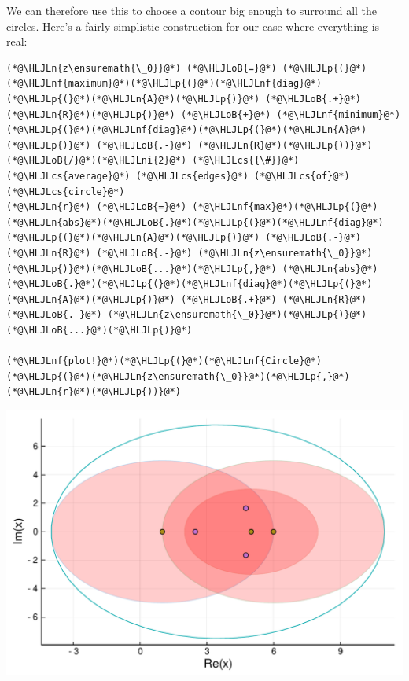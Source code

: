 \documentclass[12pt,a4paper]{article}
\newcommand{\HLJLn}[1]{#1}
\newcommand{\HLJLnf}[1]{\textcolor[RGB]{66,102,213}{#1}}
\newcommand{\HLJLni}[1]{\textcolor[RGB]{59,151,46}{#1}}
\newcommand{\HLJLoB}[1]{\textcolor[RGB]{102,102,102}{\textbf{#1}}}
\newcommand{\HLJLp}[1]{#1}
\newcommand{\HLJLcs}[1]{\textcolor[RGB]{153,153,119}{\textit{#1}}}
\begin{document}
We can therefore use this to choose a contour big enough to surround all the circles. Here's a fairly simplistic construction for our case where everything is real:


\begin{lstlisting}
(*@\HLJLn{z\ensuremath{\_0}}@*) (*@\HLJLoB{=}@*) (*@\HLJLp{(}@*)(*@\HLJLnf{maximum}@*)(*@\HLJLp{(}@*)(*@\HLJLnf{diag}@*)(*@\HLJLp{(}@*)(*@\HLJLn{A}@*)(*@\HLJLp{)}@*) (*@\HLJLoB{.+}@*) (*@\HLJLn{R}@*)(*@\HLJLp{)}@*) (*@\HLJLoB{+}@*) (*@\HLJLnf{minimum}@*)(*@\HLJLp{(}@*)(*@\HLJLnf{diag}@*)(*@\HLJLp{(}@*)(*@\HLJLn{A}@*)(*@\HLJLp{)}@*) (*@\HLJLoB{.-}@*) (*@\HLJLn{R}@*)(*@\HLJLp{))}@*) (*@\HLJLoB{/}@*)(*@\HLJLni{2}@*) (*@\HLJLcs{{\#}}@*) (*@\HLJLcs{average}@*) (*@\HLJLcs{edges}@*) (*@\HLJLcs{of}@*) (*@\HLJLcs{circle}@*)
(*@\HLJLn{r}@*) (*@\HLJLoB{=}@*) (*@\HLJLnf{max}@*)(*@\HLJLp{(}@*)(*@\HLJLn{abs}@*)(*@\HLJLoB{.}@*)(*@\HLJLp{(}@*)(*@\HLJLnf{diag}@*)(*@\HLJLp{(}@*)(*@\HLJLn{A}@*)(*@\HLJLp{)}@*) (*@\HLJLoB{.-}@*) (*@\HLJLn{R}@*) (*@\HLJLoB{.-}@*) (*@\HLJLn{z\ensuremath{\_0}}@*)(*@\HLJLp{)}@*)(*@\HLJLoB{...}@*)(*@\HLJLp{,}@*) (*@\HLJLn{abs}@*)(*@\HLJLoB{.}@*)(*@\HLJLp{(}@*)(*@\HLJLnf{diag}@*)(*@\HLJLp{(}@*)(*@\HLJLn{A}@*)(*@\HLJLp{)}@*) (*@\HLJLoB{.+}@*) (*@\HLJLn{R}@*) (*@\HLJLoB{.-}@*) (*@\HLJLn{z\ensuremath{\_0}}@*)(*@\HLJLp{)}@*)(*@\HLJLoB{...}@*)(*@\HLJLp{)}@*)

(*@\HLJLnf{plot!}@*)(*@\HLJLp{(}@*)(*@\HLJLnf{Circle}@*)(*@\HLJLp{(}@*)(*@\HLJLn{z\ensuremath{\_0}}@*)(*@\HLJLp{,}@*) (*@\HLJLn{r}@*)(*@\HLJLp{))}@*)
\end{lstlisting}

\includegraphics[width=\linewidth]{figures/Lecture8_4_1.pdf}
\end{document}
